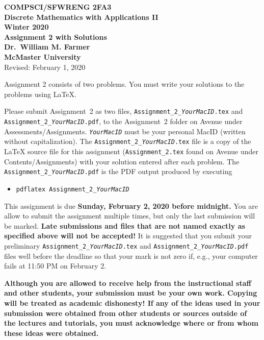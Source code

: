 \documentclass[11pt,fleqn]{article}
\begin{document}
\begin{center}

  {\large \textbf{COMPSCI/SFWRENG 2FA3}}\\[2mm]
  {\large \textbf{Discrete Mathematics with Applications II}}\\[2mm]
  {\large \textbf{Winter 2020}}\\[8mm]
  {\huge \textbf{Assignment 2 with Solutions}}\\[6mm]
  {\large \textbf{Dr.~William M. Farmer}}\\[2mm]
  {\large \textbf{McMaster University}}\\[6mm]
  {\large Revised: February 1, 2020}

\end{center}

\medskip

Assignment 2 consists of two problems.  You must write your solutions
to the problems using LaTeX.

Please submit Assignment~2 as two files,
\texttt{Assignment\_2\_\emph{YourMacID}.tex} and
\texttt{Assignment\_2\_\emph{YourMacID}.pdf}, to the Assignment~2
folder on Avenue under Assessments/Assignments.
\texttt{\emph{YourMacID}} must be your personal MacID (written without
capitalization).  The \texttt{Assignment\_2\_\emph{YourMacID}.tex}
file is a copy of the LaTeX source file for this assignment
(\texttt{Assignment\_2.tex} found on Avenue under
Contents/Assignments) with your solution entered after each problem.
The \texttt{Assignment\_2\_\emph{YourMacID}.pdf} is the PDF output
produced by executing

\begin{itemize}

  \item[] \texttt{pdflatex Assignment\_2\_\emph{YourMacID}}

\end{itemize}

This assignment is due \textbf{Sunday, February 2, 2020 before
  midnight.}  You are allow to submit the assignment multiple times,
but only the last submission will be marked.  \textbf{Late submissions
  and files that are not named exactly as specified above will not be
  accepted!}  It is suggested that you submit your preliminary
\texttt{Assignment\_2\_\emph{YourMacID}.tex} and
\texttt{Assignment\_2\_\emph{YourMacID}.pdf} files well before the
deadline so that your mark is not zero if, e.g., your computer fails
at 11:50 PM on February 2.

\textbf{Although you are allowed to receive help from the
  instructional staff and other students, your submission must be your
  own work.  Copying will be treated as academic dishonesty! If any of
  the ideas used in your submission were obtained from other students
  or sources outside of the lectures and tutorials, you must
  acknowledge where or from whom these ideas were obtained.}
\end{document}
